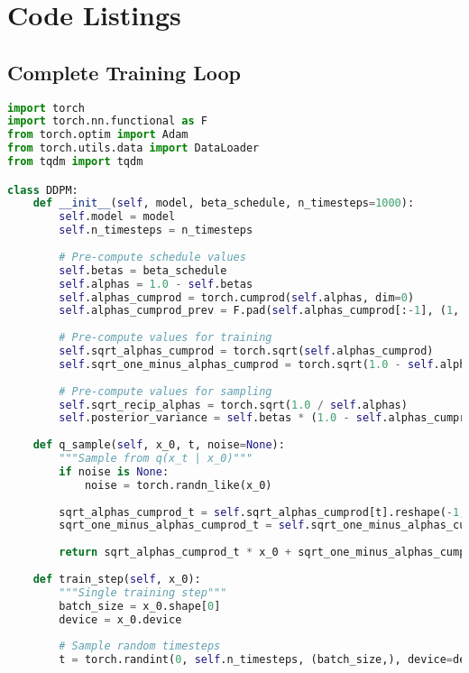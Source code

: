 \documentclass[11pt,a4paper]{article}
\theoremstyle{definition}
\begin{document}
\section{Code Listings}

\subsection{Complete Training Loop}

\begin{lstlisting}[language=Python, caption=Complete DDPM Training Implementation]
import torch
import torch.nn.functional as F
from torch.optim import Adam
from torch.utils.data import DataLoader
from tqdm import tqdm

class DDPM:
    def __init__(self, model, beta_schedule, n_timesteps=1000):
        self.model = model
        self.n_timesteps = n_timesteps
        
        # Pre-compute schedule values
        self.betas = beta_schedule
        self.alphas = 1.0 - self.betas
        self.alphas_cumprod = torch.cumprod(self.alphas, dim=0)
        self.alphas_cumprod_prev = F.pad(self.alphas_cumprod[:-1], (1, 0), value=1.0)
        
        # Pre-compute values for training
        self.sqrt_alphas_cumprod = torch.sqrt(self.alphas_cumprod)
        self.sqrt_one_minus_alphas_cumprod = torch.sqrt(1.0 - self.alphas_cumprod)
        
        # Pre-compute values for sampling
        self.sqrt_recip_alphas = torch.sqrt(1.0 / self.alphas)
        self.posterior_variance = self.betas * (1.0 - self.alphas_cumprod_prev) / (1.0 - self.alphas_cumprod)
    
    def q_sample(self, x_0, t, noise=None):
        """Sample from q(x_t | x_0)"""
        if noise is None:
            noise = torch.randn_like(x_0)
        
        sqrt_alphas_cumprod_t = self.sqrt_alphas_cumprod[t].reshape(-1, 1, 1, 1)
        sqrt_one_minus_alphas_cumprod_t = self.sqrt_one_minus_alphas_cumprod[t].reshape(-1, 1, 1, 1)
        
        return sqrt_alphas_cumprod_t * x_0 + sqrt_one_minus_alphas_cumprod_t * noise
    
    def train_step(self, x_0):
        """Single training step"""
        batch_size = x_0.shape[0]
        device = x_0.device
        
        # Sample random timesteps
        t = torch.randint(0, self.n_timesteps, (batch_size,), device=device)
        

\end{lstlisting}
\end{document}
